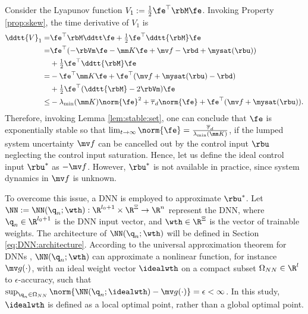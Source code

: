 \documentclass[lettersize,journal]{IEEEtran}
\begin{document}
Consider the Lyapunov function $V_1:= \tfrac{1}{2}\fe^\top \rbM\fe$. 
Invoking Property \ref{prop:skew}, the time derivative of $V_1$ is
\begin{equation}
    \begin{aligned}
        \ddtt{V}_1
        =&
        \fe^\top \rbM \ddtt \fe
        +
        \tfrac{1}{2}\fe^\top \ddtt{\rbM}\fe
        \\
        =&
        \fe^\top (
            -\rbVm \fe -\mm K \fe + \mv f
            -\rbd + \mysat(\rbu)
        )
        \\
        &
        +
        \tfrac{1}{2}
        \fe^\top \ddtt{\rbM}\fe
        \\
        =&
        -
        \fe^\top \mm K \fe 
        +
        \fe^\top (
            \mv f+\mysat(\rbu)
            -\rbd
        )
        \\
        &
        +
        \tfrac{1}{2}
        \fe^\top(\ddtt{\rbM}- 2\rbVm)\fe
        \\
        \le&
        -\lambda_{\min}(\mm K)\norm{\fe}^2
        +
        \overline\tau_d\norm{\fe}
        +
        \fe^\top (\mv f+\mysat(\rbu))
        .
    \end{aligned}
    \label{eq:lya1:dot1}
\end{equation} 
Therefore, invoking Lemma \ref{lem:stable:set}, one can conclude that $\fe$ is exponentially stable so that $\lim_{t\to\infty}\norm{\fe}=\tfrac{\overline\tau_d}{\lambda_{\min}(\mm K)}$, if the lumped system uncertainty $\mv f$ can be cancelled out by the control input $\rbu$ neglecting the control input saturation.
Hence, let us define the ideal control input $\rbu^*$ as $-\mv f$.
However, $\rbu^*$ is not available in practice, since system dynamics in $\mv f$ is unknown.

To overcome this issue, a DNN is employed to approximate $\rbu^*$.
Let $\NN:=\NN({\q}_n;\wth): \R^{l_0+1}\times\R^{\Xi}\to\R^{n}$ represent the DNN, where ${\q}_n\in\R^{l_0+1}$ is the DNN input vector, and $\wth\in\R^{\Xi}$ is the vector of trainable weights.
The architecture of $\NN({\q}_n;\wth)$ will be defined in Section \ref{eq:DNN:architecture}.
According to the universal approximation theorem for DNNs \cite{Kidger:2020aa}, $\NN({\q}_n;\wth)$ can approximate a nonlinear function, for instance $\mv g(\cdot)$, with an ideal weight vector $\idealwth$ on a compact subset $\Omega_{NN}\in\R^{l}$ to $\epsilon$-accuracy, such that $\sup_{{\q}_n\in\Omega_{NN}}\norm{ \NN({\q}_n;\idealwth) - \mv g(\cdot)} = \epsilon < \infty$.
In this study, $\idealwth$ is defined as a local optimal point, rather than a global optimal point.
\end{document}

